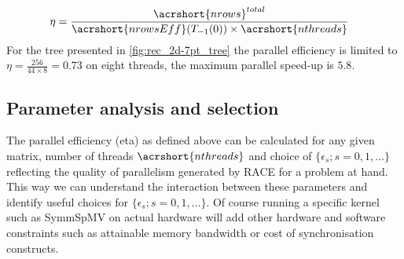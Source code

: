 \begin{align*}
	\eta &= \frac{ \acrshort{nrows}^{total}} {\acrshort{nrowsEff}(T_{-1}(0)) \times \acrshort{nthreads}} 
\end{align*}
For the tree presented in \cref{fig:rec_2d-7pt_tree} the parallel efficiency is limited to $\eta=\frac{256}{44 \times 8 } = 0.73$ on eight threads, \ie the maximum parallel speed-up is $5.8$.

\subsection{Parameter analysis and selection}
\label{subsec:param_analysis}
The parallel efficiency (\acrshort{eta}) as defined above can be calculated for any given matrix, number of threads $\acrshort{nthreads}$  and choice of $\{\epsilon_s; s=0,1,\ldots\}$ reflecting the quality of  parallelism generated by \acrshort{RACE} for a problem at hand.  This way we can understand the interaction between these parameters and identify useful choices for $\{\epsilon_s; s=0,1,\ldots\}$. Of course running a specific kernel such as \acrshort{SymmSpMV} on actual hardware will add other hardware and software constraints such as attainable memory bandwidth or cost of synchronisation constructs. 

